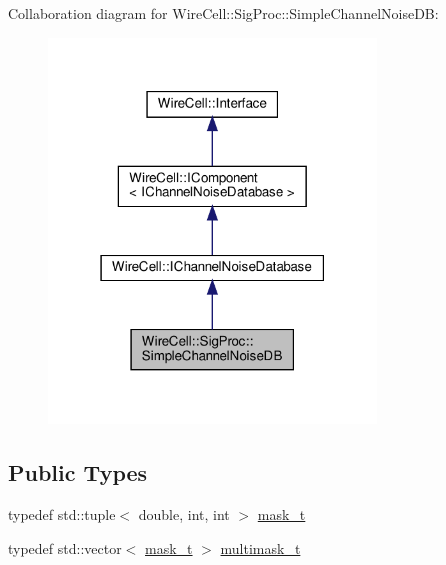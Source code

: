 Collaboration diagram for Wire\+Cell\+:\+:Sig\+Proc\+:\+:Simple\+Channel\+Noise\+DB\+:
\nopagebreak
\begin{figure}[H]
\begin{center}
\leavevmode
\includegraphics[width=247pt]{class_wire_cell_1_1_sig_proc_1_1_simple_channel_noise_d_b__coll__graph}
\end{center}
\end{figure}
\subsection*{Public Types}
\begin{DoxyCompactItemize}
\item 
typedef std\+::tuple$<$ double, int, int $>$ \hyperlink{class_wire_cell_1_1_sig_proc_1_1_simple_channel_noise_d_b_a4b7e8bae65910a6667ee80bfde4cc77d}{mask\+\_\+t}
\item 
typedef std\+::vector$<$ \hyperlink{class_wire_cell_1_1_sig_proc_1_1_simple_channel_noise_d_b_a4b7e8bae65910a6667ee80bfde4cc77d}{mask\+\_\+t} $>$ \hyperlink{class_wire_cell_1_1_sig_proc_1_1_simple_channel_noise_d_b_ac88af8d617681e36c68c5f1899452d01}{multimask\+\_\+t}
\end{DoxyCompactItemize}
